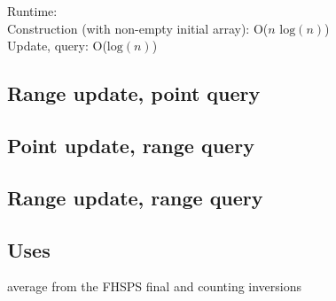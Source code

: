 
Runtime: \\
\indent Construction (with non-empty initial array): O($n \text{ log}(n)$) \\
\indent Update, query: O($\text{log}(n)$)

\subsection*{Range update, point query}



\subsection*{Point update, range query}



\subsection*{Range update, range query}



\subsection*{Uses}

average from the FHSPS final and counting inversions

\newpage